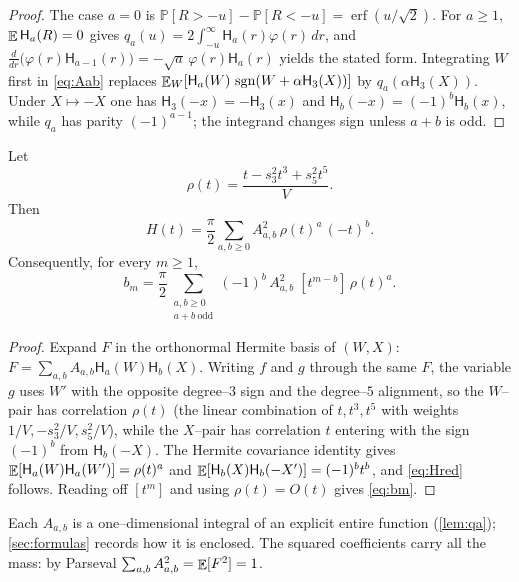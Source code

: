 \documentclass[12pt]{article}
\providecommand{\Prob}{\mathbb{P}}
\providecommand{\sgn}{\operatorname{sgn}}
\providecommand{\erf}{\operatorname{erf}}
\newcommand{\He}{\mathsf{H}}                 %
\begin{document}
\begin{proof}
The case $a=0$ is $\Prob[R>-u]-\Prob[R<-u]=\erf(u/\sqrt2)$.  For $a\ge1$,
$\E\He_a(R)=0$ gives $q_a(u)=2\int_{-u}^\infty\He_a(r)\varphi(r)\,dr$, and
$\frac{d}{dr}\bigl(\varphi(r)\He_{a-1}(r)\bigr)=-\sqrt a\,\varphi(r)\He_a(r)$
yields the stated form.  Integrating $W$ first in \eqref{eq:Aab} replaces
$\E_W[\He_a(W)\,\sgn(W+\alpha\He_3(X))]$ by $q_a(\alpha\He_3(X))$.  Under
$X\mapsto-X$ one has $\He_3(-x)=-\He_3(x)$ and $\He_b(-x)=(-1)^b\He_b(x)$, while
$q_a$ has parity $(-1)^{a-1}$; the integrand changes sign unless $a+b$ is odd.
\end{proof}

\begin{lemma}\label{lem:reduction}
Let
\begin{equation}\label{eq:rho}
   \rho(t)=\frac{t-s_3^2t^3+s_5^2t^5}{V}.
\end{equation}
Then
\begin{equation}\label{eq:Hred}
   H(t)=\frac{\pi}{2}\sum_{a,b\ge0}A_{a,b}^2\,\rho(t)^a\,(-t)^b .
\end{equation}
Consequently, for every $m\ge1$,
\begin{equation}\label{eq:bm}
   b_m=\frac{\pi}{2}\sum_{\substack{a,b\ge0\\a+b\ \mathrm{odd}}}
        (-1)^b\,A_{a,b}^2\;[t^{m-b}]\,\rho(t)^a .
\end{equation}
\end{lemma}

\begin{proof}
Expand $F$ in the orthonormal Hermite basis of $(W,X)$:
$F=\sum_{a,b}A_{a,b}\He_a(W)\He_b(X)$.  Writing $f$ and $g$ through the same $F$,
the variable $g$ uses $W'$ with the opposite degree--$3$ sign and the
degree--$5$ alignment, so the $W$--pair has correlation $\rho(t)$ (the linear
combination of $t,t^3,t^5$ with weights $1/V,-s_3^2/V,s_5^2/V$), while the
$X$--pair has correlation $t$ entering with the sign $(-1)^b$ from
$\He_b(-X)$.  The Hermite covariance identity gives
$\E[\He_a(W)\He_a(W')]=\rho(t)^a$ and
$\E[\He_b(X)\He_b(-X')]=(-1)^b t^b$, and \eqref{eq:Hred} follows.  Reading off
$[t^m]$ and using $\rho(t)=O(t)$ gives \eqref{eq:bm}.
\end{proof}

Each $A_{a,b}$ is a one--dimensional integral of an explicit entire function
(\cref{lem:qa}); \cref{sec:formulas} records how it is enclosed.  The squared
coefficients carry all the mass: by Parseval $\sum_{a,b}A_{a,b}^2=\mathop{\mathbb{E}}[F^2]=1$.
\end{document}
